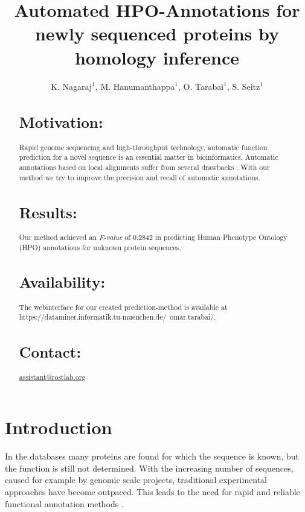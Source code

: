 \documentclass{bioinfo}
\begin{document}

\title{Automated HPO-Annotations for newly sequenced proteins by homology inference}
\author{K. Nagaraj$^{1}$, M. Hanumanthappa$^{1}$, O. Tarabai$^{1}$, S. Seitz$^{1}$}
\address{$^{1}$Fakul\"at f\"ur Informatik, Boltzmannstr. 3, 85748 Garching}



\maketitle

\begin{abstract}

\section{Motivation:}
Rapid genome sequencing and high-throughput technology, automatic function prediction for a novel sequence is an essential matter in bioinformatics. Automatic annotations based on local alignments suffer from several drawbacks \citep{Ori06}. With our method we try to improve the precision and recall of automatic annotations.
\section{Results:}
Our method achieved an \textit{F-value} of 0.2842 in predicting Human Phenotype Ontology (HPO) annotations for unknown protein sequences.

\section{Availability:}
The webinterface for our created prediction-method is available at https://dataminer.informatik.tu-muenchen.de/~omar.tarabai/.

\section{Contact:} \href{assistant@rostlab.org}{assistant@rostlab.org}
\end{abstract}

\section{Introduction}
In the databases many proteins are found for which the sequence is known, but the function is still not determined. With the increasing number of sequences, caused for example by genomic scale projects, traditional experimental approaches have become outpaced. This leads to the need for rapid and reliable functional annotation methods \citep{Rodrigues07}. 
\end{document}
